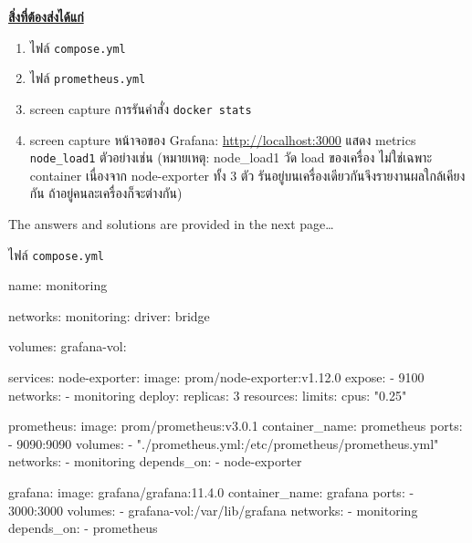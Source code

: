 \documentclass[a4paper, 10pt]{article}
\begin{document}
\newpage

\par\noindent \underline{\textbf{\textthai{สิ่งที่ต้องส่งได้แก่}}}

\begin{enumerate}
	\item \textthai{ไฟล์} \texttt{compose.yml}
	\item \textthai{ไฟล์} \texttt{prometheus.yml}
	\item screen capture \textthai{การรันคำสั่ง} \texttt{docker stats}
	\item screen capture \textthai{หน้าจอของ} Grafana: \href{http://localhost:3000}{http://localhost:3000}
	      \textthai{แสดง} metrics \texttt{node\_load1} \textthai{ตัวอย่างเช่น}
	      (\textthai{หมายเหตุ}: node\_load1 \textthai{วัด} load \textthai{ของเครื่อง} \textthai{ไม่ใช่เฉพาะ} container
	      \textthai{เนื่องจาก} node-exporter \textthai{ทั้ง} 3 \textthai{ตัว} \textthai{รันอยู่บนเครื่องเดียวกันจึงรายงานผลใกล้เคียงกัน ถ้าอยู่คนละเครื่องก็จะต่างกัน})
\end{enumerate}

\begin{flushright}
	The answers and solutions are provided in the next page\dots
\end{flushright}

\newpage

\begin{problem}
\textthai{ไฟล์} \texttt{compose.yml}
\end{problem}

\begin{solution}
	\begin{codingbox*}[language=yaml]
name: monitoring

networks:
  monitoring:
    driver: bridge

volumes:
  grafana-vol:

services:
  node-exporter:
    image: prom/node-exporter:v1.12.0
    expose:
      - 9100
    networks:
      - monitoring
    deploy:
      replicas: 3
      resources:
        limits:
          cpus: "0.25"

  prometheus:
    image: prom/prometheus:v3.0.1
    container_name: prometheus
    ports:
      - 9090:9090
    volumes:
      - "./prometheus.yml:/etc/prometheus/prometheus.yml"
    networks:
      - monitoring
    depends_on:
      - node-exporter

  grafana:
    image: grafana/grafana:11.4.0
    container_name: grafana
    ports:
      - 3000:3000
    volumes:
      - grafana-vol:/var/lib/grafana
    networks:
      - monitoring
    depends_on:
      - prometheus
\end{codingbox*}
\end{solution}
\end{document}
